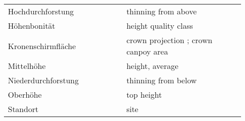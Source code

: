 \begin{singlespace}
{\begin{longtabu}{p{0.475\linewidth} p{0.475\linewidth}}
      Hochdurchforstung & thinning from above \\
      Höhenbonität & height quality class \parencite[p.~159]{Assmann1970} \\
      Kronenschirmfläche & crown projection \parencite[p.~157]{Assmann1970}; crown canpoy area \parencite[p.~158]{Assmann1970} \\
      Mittelhöhe & height, average \\
      Niederdurchforstung & thinning from below \\
      Oberhöhe & top height \\
      Standort & site \\
    \end{longtabu}
  }
\end{singlespace}

